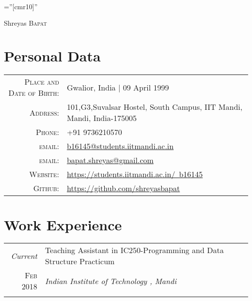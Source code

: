 \documentclass[a4paper,10pt]{article}
\begin{document}

\pagestyle{empty} %

\font\fb=''[cmr10]'' %

\par{\centering
		{\Huge Shreyas \textsc{Bapat}
	}\bigskip\par}

\section{Personal Data}

\begin{tabular}{rl}
    \textsc{Place and Date of Birth:} & Gwalior, India  | 09 April 1999 \\
    \textsc{Address:}   & 101,G3,Suvalsar Hostel, South Campus, IIT Mandi, Mandi, India-175005 \\
    \textsc{Phone:}     & +91 9736210570\\
    \textsc{email:}     & \href{mailto:b16145@students.iitmandi.ac.in}{b16145@students.iitmandi.ac.in}\\
    \textsc{email:}     & \href{mailto:bapat.shreyas@gmail.com}{bapat.shreyas@gmail.com}\\
    \textsc{Website:}     & \href{https://students.iitmandi.ac.in/~b16145}{https://students.iitmandi.ac.in/~b16145}\\
    \textsc{Github:}     & \href{https://github.com/shreyasbapat}{https://github.com/shreyasbapat}
\end{tabular}

\section{Work Experience}
\begin{tabular}{r|p{11cm}}
 \emph{Current} & Teaching Assistant in \textsc{IC250}-Programming and Data Structure Practicum \\\textsc{Feb 2018}&\emph{Indian Institute of Technology , Mandi}\\\multicolumn{2}{c}{} \\
\end{tabular}
\end{document}
